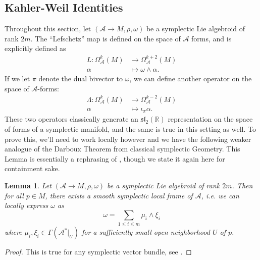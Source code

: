 \documentclass{amsart}
\newcommand{\R}{\mathbb{R}}
\newcommand{\ra}{\rightarrow}
\newtheorem{lemma}[theorem]{Lemma}
\newcommand{\A}{\mathcal{A}}
\theoremstyle{definition}
\begin{document}
\subsection{Kahler-Weil Identities}
Throughout this section, let $(\A \ra M, \rho , \omega)$ be a symplectic Lie algebroid of rank $2m$. The ``Lefschetz'' map is defined on the space of $\A$ forms, and is explicitly defined as 
\begin{align*}
    L:\Omega^k_\A(M) &\ra \Omega^{k+2}_\A(M)  \\
    \alpha &\mapsto \omega \wedge \alpha.
\end{align*}
If we let $\pi$ denote the dual bivector to $\omega$, we can define another operator on the space of $\A$-forms:
\begin{align*}
    \Lambda:\Omega^{k}_\A(M) &\ra \Omega^{k-2}_\A(M) \\
     \alpha &\mapsto \iota_\pi \alpha.
\end{align*}
These two operators classically generate an $\mathfrak{sl}_2(\R)$ representation on the space of forms of a symplectic manifold, and the same is true in this setting as well. To prove this, we'll need to work locally however and we have the following weaker analogue of the Darboux Theorem from classical symplectic Geometry. This Lemma is essentially a rephrasing of \cite[Lemma 3.23]{garmendia2025estructuresregularpoissonmanifolds}, though we state it again here for containment sake.
\begin{lemma}\label{SLADarboux}
    Let $(\A \ra M, \rho ,\omega)$ be a symplectic Lie algebroid of rank $2m$. Then for all $p \in M$, there exists a smooth symplectic local frame of $\A$, i.e. we can locally express $\omega$ as
    \begin{equation*}
        \omega = \sum_{1 \leq i \leq m} \mu_i \wedge \xi_i
    \end{equation*}
    where $\mu_i,\xi_i \in \Gamma(\A^*|_U)$ for a sufficiently small open neighborhood $U$ of $p$.
\end{lemma}
\begin{proof}
    This is true for any symplectic vector bundle, see \cite[Lemma 12.6]{LibermannMarle1987}.
\end{proof}
\end{document}
